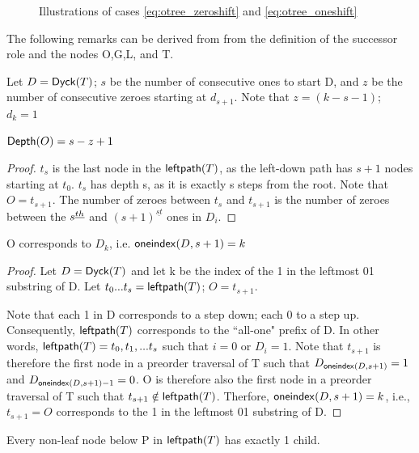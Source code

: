 \begin{figure}
    \caption{Illustrations of cases \ref{eq:otree_zeroshift} and \ref{eq:otree_oneshift} }
    \label{fig:otreeruledemo}
\end{figure}



The following remarks can be derived from from the definition of the successor role and the nodes O,G,L, and T.


Let $D=\mathsf{Dyck}{(T)}$; $s$ be the number of consecutive ones to start D, and $z$ be the number of consecutive zeroes starting at $d_{s+1}$.  Note that $z=(k-s-1)$; $d_{k}=1$

\begin{remark} $\mathsf{Depth}{(O)}=s-z+1$ \label{re:o_depth_formula}
\end{remark} 
\begin{proof}


    $t_s$ is the last node in the $\mathsf{leftpath}{(T)}$, as the left-down path has $s+1$ nodes starting at $t_0$. $t_s$ has depth s, as it is exactly s steps from the root.  Note that $O=t_{s+1}$.  The number of zeroes between $t_s$ and $t_{s+1}$ is the number of zeroes between the $s^{\underline{th}}$ and $(s+1)^{\underline{st}}$ ones in $D_i$.  

\end{proof} 
\begin{remark}O corresponds to $D_k$, i.e. $\mathsf{oneindex}({D}, s+1)=k$
\end{remark}
\begin{proof}
    Let $D=\mathsf{Dyck}{(T)}$ and let k be the index of the 1 in the leftmost 01 substring of D.  Let $t_0...t_s=\mathsf{leftpath}{(T)}$; $O=t_{s+1}$.


    Note that each 1 in D corresponds to a step down; each 0 to a step up.  Consequently, $\mathsf{leftpath}{(T)}$ corresponds to the ``all-one" prefix of D.  In other words, $\mathsf{leftpath}{(T)}=t_0,t_1,...t_{s}$ such that $i=0$ or $D_i=1$. Note that $t_{s+1}$ is therefore the first node in a preorder traversal of T such that $D_{\mathsf{oneindex}({D}, s+1)}=1$ and $D_{\mathsf{oneindex}({D}, s+1)-1}=0$.  O is therefore also the first node in a preorder traversal of T such that $t_{s+1} \notin \mathsf{leftpath}{(T)}$.  Therfore, $\mathsf{oneindex}({D}, s+1)=k$, i.e., $t_{s+1}=O$ corresponds to the 1 in the leftmost 01 substring of D.

\end{proof}
\begin{remark} Every non-leaf node below P in $\mathsf{leftpath}{(T)}$ has exactly 1 child.  
\end{remark}

